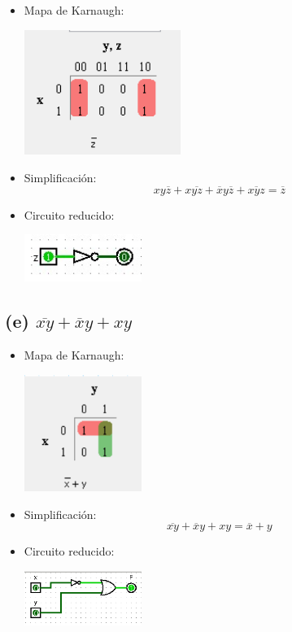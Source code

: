 \begin{itemize}
    \item Mapa de Karnaugh:
\begin{center}
    \includegraphics[width=0.4\textwidth]{recursos/Ejercicio3/mapas/mapa_d).png}
\end{center}

    \item Simplificación: \[ xy\overline{z} + x\overline{yz} + \overline{x}y\overline{z} + \overline{xyz} = \overline{z} \]

    \item Circuito reducido:
\begin{center}
    \includegraphics[width=0.3\textwidth]{recursos/Ejercicio3/circuito/circuito_d).png}
\end{center}
\end{itemize}

\subsection*{(e) $\overline{xy} + \overline{x}y + xy$}

\begin{itemize}
    \item Mapa de Karnaugh:
\begin{center}
    \includegraphics[width=0.3\textwidth]{recursos/Ejercicio3/mapas/mapa_e).png}
\end{center}

    \item Simplificación: \[ \overline{xy} + \overline{x}y + xy = \overline{x} + y \]

    \item Circuito reducido:
\begin{center}
    \includegraphics[width=0.3\textwidth]{recursos/Ejercicio3/circuito/circuito_e)2.png}
\end{center}
\end{itemize}

